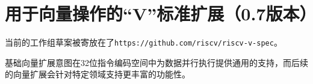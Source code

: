 \chapter{用于向量操作的“V”标准扩展（0.7版本）}
\label{sec:vector}

当前的工作组草案被寄放在了{\tt https://github.com/riscv/riscv-v-spec}。

\begin{commentary}
  基础向量扩展意图在32位指令编码空间中为数据并行执行提供通用的支持，而后续的向量扩展会针对特定领域支持更丰富的功能性。
\end{commentary}
  


